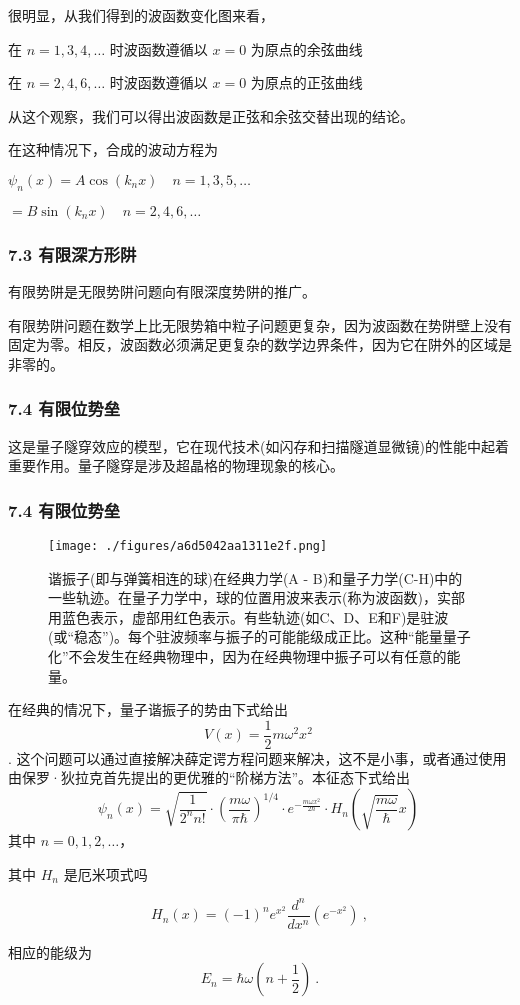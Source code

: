 很明显，从我们得到的波函数变化图来看，

在 $n = 1, 3, 4, \ldots$ 时波函数遵循以 $x = 0$ 为原点的余弦曲线

在 $n = 2, 4, 6, \ldots$ 时波函数遵循以 $x = 0$ 为原点的正弦曲线

从这个观察，我们可以得出波函数是正弦和余弦交替出现的结论。

在这种情况下，合成的波动方程为

$\psi_n(x) = A \cos(k_n x) \quad n = 1, 3, 5, \ldots$

$ = B \sin(k_n x) \quad n = 2, 4, 6, \ldots$

\subsubsection{7.3 有限深方形阱}
有限势阱是无限势阱问题向有限深度势阱的推广。

有限势阱问题在数学上比无限势箱中粒子问题更复杂，因为波函数在势阱壁上没有固定为零。相反，波函数必须满足更复杂的数学边界条件，因为它在阱外的区域是非零的。

\subsubsection{7.4 有限位势垒}
这是量子隧穿效应的模型，它在现代技术(如闪存和扫描隧道显微镜)的性能中起着重要作用。量子隧穿是涉及超晶格的物理现象的核心。

\subsubsection{7.4 有限位势垒}
\begin{figure}[ht]
\centering
\texttt{[image: ./figures/a6d5042aa1311e2f.png]}
\caption{谐振子(即与弹簧相连的球)在经典力学(A - B)和量子力学(C-H)中的一些轨迹。在量子力学中，球的位置用波来表示(称为波函数)，实部用蓝色表示，虚部用红色表示。有些轨迹(如C、D、E和F)是驻波(或“稳态”)。每个驻波频率与振子的可能能级成正比。这种“能量量子化”不会发生在经典物理中，因为在经典物理中振子可以有任意的能量。} \label{fig_LZLX_9}
\end{figure}
在经典的情况下，量子谐振子的势由下式给出
$$V(x) = \frac{1}{2}m\omega^2 x^2~$$.
这个问题可以通过直接解决薛定谔方程问题来解决，这不是小事，或者通过使用由保罗·狄拉克首先提出的更优雅的“阶梯方法”。本征态下式给出
$$\psi_n(x) = \sqrt{\frac{1}{2^n n!}} \cdot \left(\frac{m\omega}{\pi\hbar}\right)^{1/4} \cdot e^{-\frac{m\omega x^2}{2\hbar}} \cdot H_n \left(\sqrt{\frac{m\omega}{\hbar}} x\right)~$$
其中 $n = 0, 1, 2, \ldots$，

其中 $H_n$ 是厄米项式吗

$$H_n(x) = (-1)^n e^{x^2} \frac{d^n}{dx^n} \left(e^{-x^2}\right)~,$$

相应的能级为
$$E_n = \hbar \omega \left(n + \frac{1}{2}\right)~.$$

